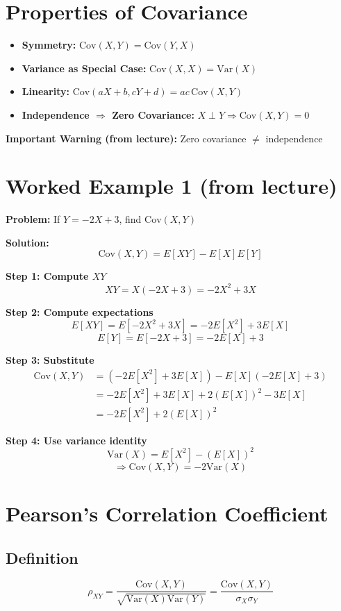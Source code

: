 \documentclass[11pt]{article}
\begin{document}
\section{Properties of Covariance}
\begin{itemize}
    \item \textbf{Symmetry:} $\text{Cov}(X,Y) = \text{Cov}(Y,X)$
    \item \textbf{Variance as Special Case:} $\text{Cov}(X,X) = \text{Var}(X)$
    \item \textbf{Linearity:} $\text{Cov}(aX+b, cY+d) = ac\,\text{Cov}(X,Y)$
    \item \textbf{Independence $\Rightarrow$ Zero Covariance:} $X \perp Y \Rightarrow \text{Cov}(X,Y) = 0$
\end{itemize}
\textbf{Important Warning (from lecture):} Zero covariance $\neq$ independence

\section{Worked Example 1 (from lecture)}
\textbf{Problem:}
If $Y = -2X + 3$, find $\text{Cov}(X,Y)$

\textbf{Solution:}
\[ \text{Cov}(X,Y) = E[XY] - E[X]E[Y] \]

\textbf{Step 1: Compute $XY$}
\[ XY = X(-2X + 3) = -2X^2 + 3X \]

\textbf{Step 2: Compute expectations}
\[ E[XY] = E[-2X^2 + 3X] = -2E[X^2] + 3E[X] \]
\[ E[Y] = E[-2X + 3] = -2E[X] + 3 \]

\textbf{Step 3: Substitute}
\begin{align*}
\text{Cov}(X,Y) &= (-2E[X^2] + 3E[X]) - E[X](-2E[X] + 3) \\
&= -2E[X^2] + 3E[X] + 2(E[X])^2 - 3E[X] \\
&= -2E[X^2] + 2(E[X])^2
\end{align*}

\textbf{Step 4: Use variance identity}
\[ \text{Var}(X) = E[X^2] - (E[X])^2 \]
\[ \Rightarrow \text{Cov}(X,Y) = -2\text{Var}(X) \]

\section{Pearson’s Correlation Coefficient}
\subsection{Definition}
\[ \rho_{XY} = \frac{\text{Cov}(X,Y)}{\sqrt{\text{Var}(X)\text{Var}(Y)}} = \frac{\text{Cov}(X,Y)}{\sigma_X \sigma_Y} \]
\end{document}

